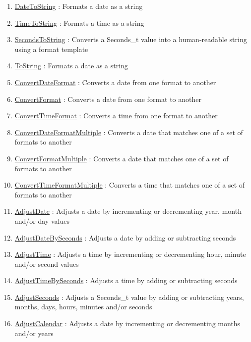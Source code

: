 \begin{enumerate}
\item \hyperlink{ecldoc:date.datetostring}{DateToString}
: Formats a date as a string
\item \hyperlink{ecldoc:date.timetostring}{TimeToString}
: Formats a time as a string
\item \hyperlink{ecldoc:date.secondstostring}{SecondsToString}
: Converts a Seconds\_t value into a human-readable string using a format template
\item \hyperlink{ecldoc:date.tostring}{ToString}
: Formats a date as a string
\item \hyperlink{ecldoc:date.convertdateformat}{ConvertDateFormat}
: Converts a date from one format to another
\item \hyperlink{ecldoc:date.convertformat}{ConvertFormat}
: Converts a date from one format to another
\item \hyperlink{ecldoc:date.converttimeformat}{ConvertTimeFormat}
: Converts a time from one format to another
\item \hyperlink{ecldoc:date.convertdateformatmultiple}{ConvertDateFormatMultiple}
: Converts a date that matches one of a set of formats to another
\item \hyperlink{ecldoc:date.convertformatmultiple}{ConvertFormatMultiple}
: Converts a date that matches one of a set of formats to another
\item \hyperlink{ecldoc:date.converttimeformatmultiple}{ConvertTimeFormatMultiple}
: Converts a time that matches one of a set of formats to another
\item \hyperlink{ecldoc:date.adjustdate}{AdjustDate}
: Adjusts a date by incrementing or decrementing year, month and/or day values
\item \hyperlink{ecldoc:date.adjustdatebyseconds}{AdjustDateBySeconds}
: Adjusts a date by adding or subtracting seconds
\item \hyperlink{ecldoc:date.adjusttime}{AdjustTime}
: Adjusts a time by incrementing or decrementing hour, minute and/or second values
\item \hyperlink{ecldoc:date.adjusttimebyseconds}{AdjustTimeBySeconds}
: Adjusts a time by adding or subtracting seconds
\item \hyperlink{ecldoc:date.adjustseconds}{AdjustSeconds}
: Adjusts a Seconds\_t value by adding or subtracting years, months, days, hours, minutes and/or seconds
\item \hyperlink{ecldoc:date.adjustcalendar}{AdjustCalendar}
: Adjusts a date by incrementing or decrementing months and/or years

\end{enumerate}
